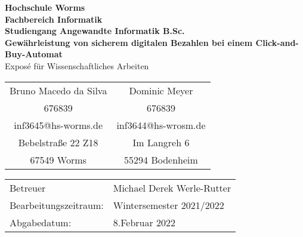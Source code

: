 \begin{titlepage}
    \vspace*{2mm}
    \begin{center}
        \Large
        \textbf{Hochschule Worms}\\
        \textbf{Fachbereich Informatik}\\
        \textbf{Studiengang Angewandte Informatik B.Sc.}\\
        \vspace{1cm}
        \textbf{Gewährleistung von sicherem digitalen Bezahlen bei einem Click-and-Buy-Automat}\\
        \vspace{1cm}
        \large
        Exposé für Wissenschaftliches Arbeiten\\
        \vspace{4cm}
        \begin {table}[ht]
            \centering
            \begin{tabular}{c c}
                Bruno Macedo da Silva    & Dominic Meyer \\ 
                676839                   & 676839         \\
                inf3645@hs-worms.de      & inf3644@hs-wrosm.de \\
                Bebelstraße 22 Z18       & Im Langreh 6 \\
                67549 Worms              & 55294 Bodenheim \\
            \end{tabular}
        \end {table}
        \vspace{2cm}
        \large
        \vspace{1cm}
         \begin {table}[ht]
             \centering
             \begin{tabular}{l l}
                Betreuer                & Michael Derek Werle-Rutter \\
                Bearbeitungszeitraum:   & Wintersemester 2021/2022 \\
                Abgabedatum:            & 8.Februar 2022 \\
             \end{tabular}
         \end {table}
    \end{center}
    \normalsize
    \vfill
 


\end{titlepage}